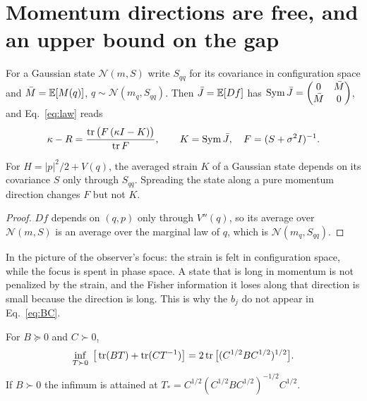 \section{Momentum directions are free, and an upper bound on the gap}
\label{sec:upper}

For a Gaussian state $\mathcal N(m,S)$ write $S_{qq}$ for its covariance in configuration space and $\bar M = \mathbb{E}[M(q)]$, $q \sim \mathcal N(m_q, S_{qq})$. Then $\bar J = \mathbb{E}[Df]$ has $\operatorname{Sym}\bar J = \begin{pmatrix} 0 & \bar M \\ \bar M & 0\end{pmatrix}$, and Eq.~\eqref{eq:law} reads
\begin{equation}
\kappa - R = \frac{\operatorname{tr}\big(F\,(\kappa I - K)\big)}{\operatorname{tr} F}, \qquad K = \operatorname{Sym}\bar J, \quad F = (S+\sigma^2I)^{-1}.
\label{eq:gaplaw}
\end{equation}

\begin{proposition}
\label{prop:momentum}
For $H = |p|^2/2 + V(q)$, the averaged strain $K$ of a Gaussian state depends on its covariance $S$ only through $S_{qq}$. Spreading the state along a pure momentum direction changes $F$ but not $K$.
\end{proposition}

\begin{proof}
$Df$ depends on $(q,p)$ only through $V''(q)$, so its average over $\mathcal N(m,S)$ is an average over the marginal law of $q$, which is $\mathcal N(m_q, S_{qq})$.
\end{proof}

In the picture of the observer's focus: the strain is felt in configuration space, while the focus is spent in phase space. A state that is long in momentum is not penalized by the strain, and the Fisher information it loses along that direction is small because the direction is long. This is why the $b_j$ do not appear in Eq.~\eqref{eq:BC}.

\begin{lemma}
\label{lem:matrix}
For $B \succeq 0$ and $C \succ 0$,
\begin{equation}
\inf_{T \succ 0}\;\big[\operatorname{tr}(BT) + \operatorname{tr}(CT^{-1})\big] = 2\operatorname{tr}\big[(C^{1/2}BC^{1/2})^{1/2}\big].
\label{eq:matrix}
\end{equation}
If $B \succ 0$ the infimum is attained at $T_* = C^{1/2}(C^{1/2}BC^{1/2})^{-1/2}C^{1/2}$.
\end{lemma}

